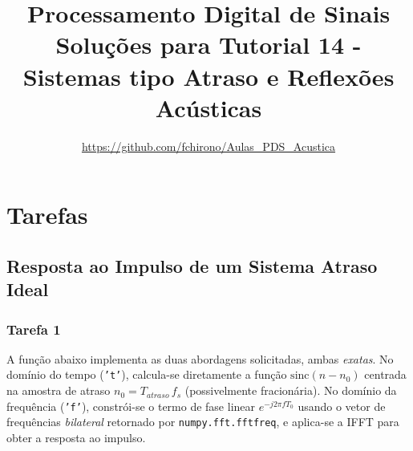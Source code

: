 \documentclass[a4paper,twoside,12pt]{article}
\title{\vspace{-2cm} Processamento Digital de Sinais\\ Soluções para Tutorial 14 - Sistemas tipo Atraso e Reflexões Acústicas}
\author{\url{https://github.com/fchirono/Aulas_PDS_Acustica}}
\begin{document}
	\date{}
	\maketitle
	
	
	\setcounter{section}{1}
	\section{Tarefas}
	
	\subsection{Resposta ao Impulso de um Sistema Atraso Ideal}
	
	\subsubsection*{Tarefa 1}
	
	A função abaixo implementa as duas abordagens solicitadas, ambas \emph{exatas}. No domínio do tempo (\texttt{'t'}), calcula-se diretamente a função $\mathrm{sinc}(n-n_0)$ centrada na amostra de atraso $n_0 = T_{atraso}\,f_s$ (possivelmente fracionária). No domínio da frequência (\texttt{'f'}), constrói-se o termo de fase linear $e^{-j2\pi f T_0}$ usando o vetor de frequências \emph{bilateral} retornado por \texttt{numpy.fft.fftfreq}, e aplica-se a IFFT para obter a resposta ao impulso.
	
\end{document}
